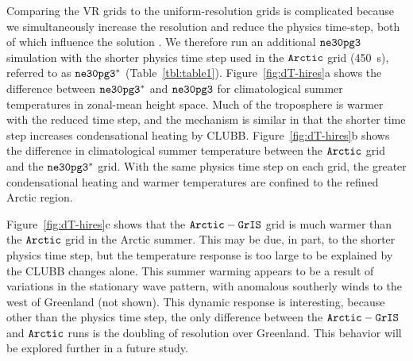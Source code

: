 \documentclass[draft]{agujournal2019}
\begin{document}
Comparing the VR grids to the uniform-resolution grids is complicated because we simultaneously increase the resolution and reduce the physics time-step, both of which influence the solution \cite{W2008TELLUS}. We therefore run an additional $\tt ne30pg3$ simulation with the shorter physics time step used in the $\tt Arctic$ grid (450~s), referred to as $\tt ne30pg3^{*}$ (Table~\ref{tbl:table1}). Figure~\ref{fig:dT-hires}a shows the difference between $\tt ne30pg3^{*}$ and $\tt ne30pg3$ for climatological summer temperatures in zonal-mean height space. Much of the troposphere is warmer with the reduced time step, and the mechanism is similar in that the shorter time step increases condensational heating by CLUBB. Figure~\ref{fig:dT-hires}b shows the difference in climatological summer temperature between the $\tt Arctic$ grid and the $\tt ne30pg3^{*}$ grid.  With the same physics time step on each grid, the greater condensational heating and warmer temperatures are confined to the refined Arctic region.

Figure~\ref{fig:dT-hires}c shows that the $\tt Arctic-GrIS$ grid is much warmer than the $\tt Arctic$ grid in the Arctic summer. This may be due, in part, to the shorter physics time step,
but the temperature response is too large to be explained by the CLUBB changes alone. This summer warming appears to be a result of variations in the stationary wave pattern, with anomalous southerly winds to the west of Greenland (not shown). This dynamic response is interesting, because other than the physics time step, the only difference between the $\tt Arctic-GrIS$ and $\tt Arctic$ runs is the doubling of resolution over Greenland. This behavior will be explored further in a future study.
\end{document}

